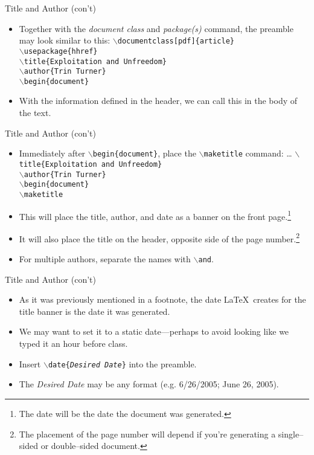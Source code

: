 \documentclass[pdf]{prosper}
\begin{document}
\begin{slide}{Title and Author (con't)}
	\begin{itemize}
		\item Together with the \textit{document class} and \textit{package(s)} command, the preamble may look similar to this:
				\texttt{$\backslash$documentclass[pdf]\{article\}} \\
				\texttt{$\backslash$usepackage\{hhref\}} \\
				\texttt{$\backslash$title\{Exploitation and Unfreedom\}} \\
				\texttt{$\backslash$author\{Trin Turner\}} \\
				\texttt{$\backslash$begin\{document\}}
		\item With the information defined in the header, we can call this in the body of the text.
	\end{itemize}
\end{slide}
\begin{slide}{Title and Author (con't)}
	\begin{itemize}
		\item Immediately after \texttt{$\backslash$begin\{document\}}, place the \texttt{$\backslash$maketitle} command:
			\ldots
			\texttt{$\backslash$title\{Exploitation and Unfreedom\}} \\
			\texttt{$\backslash$author\{Trin Turner\}} \\
			\texttt{$\backslash$begin\{document\}} \\
			\texttt{$\backslash$maketitle}
		\item This will place the title, author, and date as a banner on the front page.\footnote{The date will be the date the document was generated.}
		\item It will also place the title on the header, opposite side of the page number.\footnote{The placement of the page number will depend if you're generating a single--sided or double--sided document.}
		\item For multiple authors, separate the names with \texttt{$\backslash$and}.
	\end{itemize}
\end{slide}
\begin{slide}{Title and Author (con't)}
	\begin{itemize}
		\item	As it was previously mentioned in a footnote, the date \LaTeX\ creates for the title banner is the date it was generated.
		\item We may want to set it to a static date---perhaps to avoid looking like we typed it an hour before class.
		\item Insert \texttt{$\backslash$date\{\textit{Desired Date}\}} into the preamble.
		\item The \textit{Desired Date} may be any format (e.g. 6/26/2005; June 26, 2005).
	\end{itemize}
\end{slide}
\end{document}
